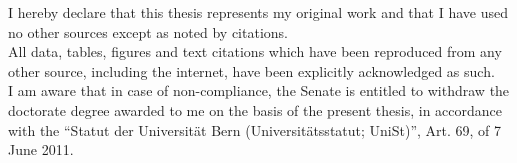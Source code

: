 \documentclass[
10pt, %
english, %
doublespacing, %
headsepline, %
]{MastersDoctoralThesis} %
\begin{document}



\mainmatter %

\pagestyle{thesis} %










\printbibliography


\begin{declaration}
\addchaptertocentry{\authorshipname} %

\vspace{1cm}

 \vspace{0.5cm}

 \vspace{2cm}

{\noindent I  hereby  declare  that  this  thesis represents my  original  work and  that  I  have  used  no  other sources except as noted by citations.\\
All  data,  tables,  figures  and  text  citations  which  have  been  reproduced  from  any  other source, including the internet, have been explicitly acknowledged as such.\\
I am aware that in case of non-compliance, the Senate is entitled to withdraw the doctorate degree awarded to me on the basis of the present thesis, in accordance with the “Statut der Universität Bern (Universitätsstatut; UniSt)”, Art. 69, of 7 June 2011.\par} \vspace{1cm}
 
 
 \vspace{1cm}
\end{declaration}
\end{document}
